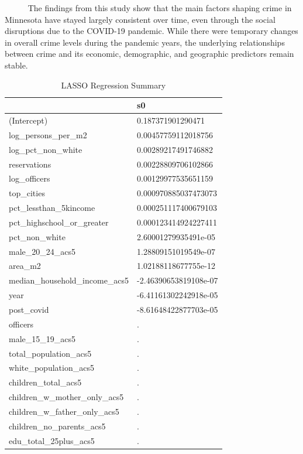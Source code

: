 \documentclass[
  11pt,
  letterpaper,
  DIV=11,
  numbers=noendperiod]{scrartcl}
\begin{document}
~~~~~ The findings from this study show that the main factors shaping
crime in Minnesota have stayed largely consistent over time, even
through the social disruptions due to the COVID-19 pandemic. While there
were temporary changes in overall crime levels during the pandemic
years, the underlying relationships between crime and its economic,
demographic, and geographic predictors remain stable.

\begin{table}

\caption{\label{tab:lasso_regression}LASSO Regression Summary}
\centering
\begin{tabular}[t]{l|l}
\hline
  & s0\\
\hline
(Intercept) & 0.187371901290471\\
\hline
log\_persons\_per\_m2 & 0.00457759112018756\\
\hline
log\_pct\_non\_white & 0.00289217491746882\\
\hline
reservations & 0.00228809706102866\\
\hline
log\_officers & 0.00129977535651159\\
\hline
top\_cities & 0.000970885037473073\\
\hline
pct\_lessthan\_5kincome & 0.000251117400679103\\
\hline
pct\_highschool\_or\_greater & 0.000123414924227411\\
\hline
pct\_non\_white & 2.60001279935491e-05\\
\hline
male\_20\_24\_acs5 & 1.28809151019549e-07\\
\hline
area\_m2 & 1.02188118677755e-12\\
\hline
median\_household\_income\_acs5 & -2.46390653819108e-07\\
\hline
year & -6.41161302242918e-05\\
\hline
post\_covid & -8.61648422877703e-05\\
\hline
officers & .\\
\hline
male\_15\_19\_acs5 & .\\
\hline
total\_population\_acs5 & .\\
\hline
white\_population\_acs5 & .\\
\hline
children\_total\_acs5 & .\\
\hline
children\_w\_mother\_only\_acs5 & .\\
\hline
children\_w\_father\_only\_acs5 & .\\
\hline
children\_no\_parents\_acs5 & .\\
\hline
edu\_total\_25plus\_acs5 & .\\

\end{tabular}
\end{table}
\end{document}
